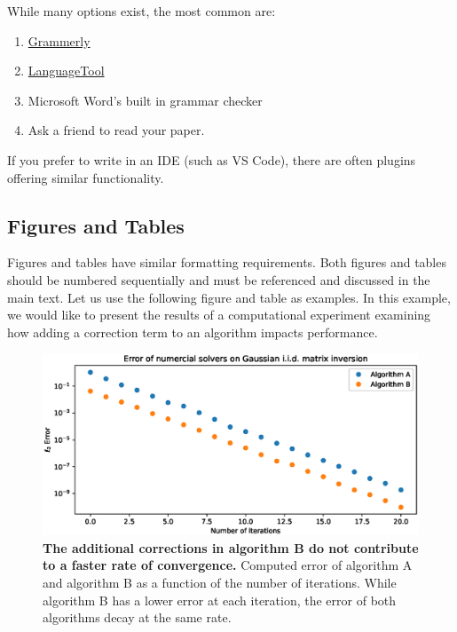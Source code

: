 \documentclass[]{article}
\begin{document}
While many options exist, the most common are:
\begin{enumerate}
    \item \href{https://www.grammarly.com/}{Grammerly}
    \item \href{https://languagetool.org/}{LanguageTool}
    \item Microsoft Word's built in grammar checker
    \item Ask a friend to read your paper.
\end{enumerate}
If you prefer to write in an IDE (such as VS Code), there are often plugins offering similar functionality.


\pagebreak

\subsection{Figures and Tables}

Figures and tables have similar formatting requirements. Both figures and tables should be numbered sequentially and must be referenced and discussed in the main text.
Let us use the following figure and table as examples. In this example, we would like to present the results of a computational experiment examining how adding a correction term to an algorithm impacts performance.

\begin{figure}[htb!]
    \includegraphics[width=\textwidth]{figure.eps}
    \caption{{\bf The additional corrections in algorithm B do not contribute to a faster rate of convergence.} Computed error of algorithm A and algorithm B as a function of the number of iterations. While algorithm B has a lower error at each iteration, the error of both algorithms decay at the same rate.}
\end{figure}
\end{document}
